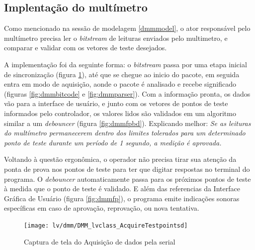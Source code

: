         \clearpage
        \subsection{Implentação do multímetro}
            
            
            Como mencionado na sessão de modelagem \ref{dmmmodel}, o ator responsável pelo multímetro precisa ler o \textit{bitstream} de leituras enviados pelo multimetro, e comparar e validar com os vetores de teste desejados.
            
            A implementação foi da seguinte forma: o \textit{bitstream} passa por uma etapa inicial de sincronização (figura \ref{fig:dmmacq}), até que se chegue ao inicio do pacote, em seguida entra em modo de aquisição, aonde o pacote é analisado e recebe significado (figuras \ref{fig:dmmbitcode} e \ref{fig:dmmparser}). Com a informação pronta, os dados vão para a interface de usuário, e junto com os vetores de pontos de teste informados pelo controlador, os valores lidos são validados em um algoritmo similar a um \textit{debouncer} (figura \ref{fig:dmmfpbd}). Explicando melhor: \textit{Se as leituras do multímetro permanecerem dentro dos limites tolerados para um determinado ponto de teste durante um período de 1 segundo, a medição é aprovada.} 
            
            Voltando à questão ergonômica, o operador não precisa tirar sua atenção da ponta de prova nos pontos de teste para ter que digitar respostas no terminal do programa. O \textit{debouncer} automaticamente passa para os próximos pontos de teste à medida que o ponto de teste é validado. E além das referencias da Interface Gráfica de Usuário (figura \ref{fig:dmmfp}), o programa emite indicações sonoras específicas em caso de aprovação, reprovação, ou nova tentativa.
            

            \begin{figure}
                \centering
                 \texttt{[image: lv/dmm/DMM\_lvclass\_AcquireTestpointsd]}
                \caption{Captura de tela do Aquisição de dados pela serial}
                \label{fig:dmmacq}
            \end{figure}
            
